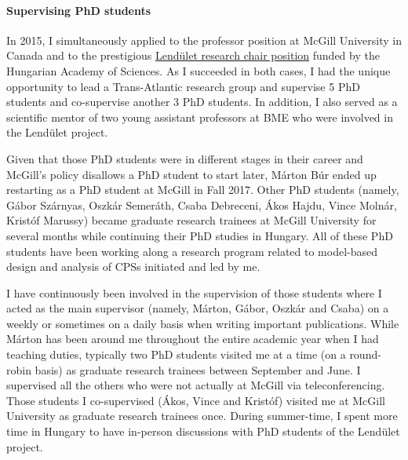 \paragraph{Supervising PhD students}
In 2015, I simultaneously applied to the professor position at McGill University in Canada and to the prestigious 
\href{https://mta.hu/lendulet}{Lendület research chair position} funded by the Hungarian Academy of Sciences. 
As I succeeded in both cases, I had the unique opportunity to lead a Trans-Atlantic research group and supervise 5 PhD 
students and co-supervise another 3 PhD students.  In addition, I also served as a scientific mentor of two young assistant 
professors at BME who were involved in the Lendület project.

Given that those PhD students were in different stages in their career and McGill's policy disallows a PhD student to start 
later, Márton Búr ended up restarting as a PhD student at McGill in Fall 2017. Other PhD students (namely, Gábor 
Szárnyas, Oszkár Semeráth, Csaba Debreceni, Ákos Hajdu, Vince Molnár, Kristóf Marussy) became graduate research 
trainees at McGill University for several months while continuing their PhD studies in Hungary. 
All of these PhD students have been working along a research program 
related to model-based design and analysis of CPSs initiated and led by me.

I have continuously been involved in the supervision of those students where I acted as the main supervisor (namely, 
Márton, Gábor, Oszkár and Csaba) on a weekly or sometimes on a daily basis when writing important publications. While 
Márton has been around me throughout the entire academic year when I had teaching duties, typically two PhD students 
visited me at a time (on a round-robin basis) as graduate research trainees between September and June. I supervised all the others who were not actually at McGill via 
teleconferencing. Those students I co-supervised (Ákos, Vince and Kristóf) visited me at McGill University as graduate 
research trainees once. During summer-time, I spent more time in Hungary to have in-person discussions with PhD students of the Lendület project.



